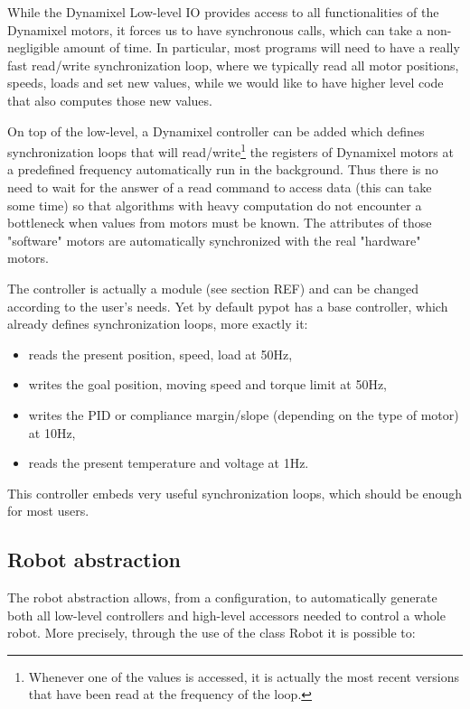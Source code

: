 While the Dynamixel Low-level IO provides access to all functionalities of the Dynamixel motors, it forces us to have synchronous calls, which can take a non-negligible amount of time. In particular, most programs will need to have a really fast read/write synchronization loop, where we typically read all motor positions, speeds, loads and set new values, while we would like to have higher level code that also computes those new values.

On top of the low-level, a Dynamixel controller can be added which defines synchronization loops that will read/write\footnote{Whenever one of the values is accessed, it is actually the most recent versions that have been read at the frequency of the loop.} the registers of Dynamixel motors at a predefined frequency automatically run in the background. Thus there is no need to wait for the answer of a read command to access data (this can take some time) so that algorithms with heavy computation do not encounter a bottleneck when values from motors must be known. The attributes of those "software" motors are automatically synchronized with the real "hardware" motors.

The controller is actually a module (see section REF) and can be changed according to the user’s needs. Yet by default pypot has a base controller, which already defines synchronization loops, more exactly it:

\begin{itemize}
    \item reads the present position, speed, load at 50Hz,
    \item writes the goal position, moving speed and torque limit at 50Hz,
    \item writes the PID or compliance margin/slope (depending on the type of motor) at 10Hz,
    \item reads the present temperature and voltage at 1Hz.
\end{itemize}

This controller embeds very useful synchronization loops, which should be enough for most users.



\subsection{Robot abstraction} %

The robot abstraction allows, from a configuration, to automatically generate both all low-level controllers and high-level accessors needed to control a whole robot. More precisely, through the use of the class Robot it is possible to:

